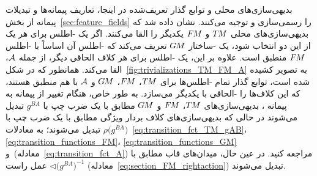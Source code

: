 بدیهی‌سازی‌های محلی و توابع گذار تعریف‌شده در اینجا، تعاریف پیمانه‌ها و تبدیلات پیمانه از بخش~\ref{sec:feature_fields} را رسمی‌سازی و توجیه می‌کنند.
نشان داده شد که بدیهی‌سازی‌های محلی $T\mkern-1.5muM$ و $F\mkern-1.5muM$ یکدیگر را القا می‌کنند.
اگر یک -اطلس برای هر یک از این دو انتخاب شود، یک -ساختار $G\mkern-1.4muM$ تعریف می‌کند که -اطلس آن اساساً با -اطلس $F\mkern-1.5muM$ منطبق است.
علاوه بر این، یک -اطلس برای هر کلاف الحاقی دیگر، از جمله $\mathcal{A}$، القا می‌کند.
همانطور که در شکل~\ref{fig:trivializations_TM_FM_A} به تصویر کشیده شده است، توابع گذار تمام -اطلس‌ها برای $T\mkern-1.5muM$، $F\mkern-1.5muM$، $G\mkern-1.4muM$ و $\mathcal{A}$ با هم منطبق هستند، که این کلاف‌ها را -الحاقی با یکدیگر می‌سازد.
به طور خاص، هنگام تغییر از پیمانه  به پیمانه ، بدیهی‌سازی‌های $T\mkern-1.5muM$، $F\mkern-1.5muM$ و $G\mkern-1.4muM$ مطابق با یک ضرب چپ با $g^{BA}$ تبدیل می‌شوند در حالی که بدیهی‌سازی‌های کلاف بردار ویژگی مطابق با یک ضرب چپ با $\rho\big(g^{BA}\big)$ تبدیل می‌شوند؛ به معادلات~\eqref{eq:transition_fct_TM_gAB}، \eqref{eq:transition_functions_FM}، \eqref{eq:transition_functions_GM} و~(معادله~\eqref{eq:transition_fct_A}) مراجعه کنید.
در عین حال، میدان‌های قاب مطابق با عمل راست $\lhd \big( g^{BA} \big)^{-1}$ (معادله~\eqref{eq:section_FM_rightaction}) تبدیل می‌شوند.